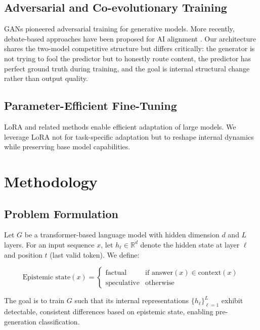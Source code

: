 \documentclass[11pt,a4paper]{article}
\begin{document}
\subsection{Adversarial and Co-evolutionary Training}

GANs \citep{goodfellow2014generative} pioneered adversarial training for generative models. More recently, debate-based approaches have been proposed for AI alignment \citep{irving2018ai}. Our architecture shares the two-model competitive structure but differs critically: the generator is not trying to fool the predictor but to honestly route content, the predictor has perfect ground truth during training, and the goal is internal structural change rather than output quality.

\subsection{Parameter-Efficient Fine-Tuning}

LoRA \citep{hu2021lora} and related methods \citep{lialin2023scaling} enable efficient adaptation of large models. We leverage LoRA not for task-specific adaptation but to reshape internal dynamics while preserving base model capabilities.

\section{Methodology}

\subsection{Problem Formulation}

Let $G$ be a transformer-based language model with hidden dimension $d$ and $L$ layers. For an input sequence $x$, let $h_\ell \in \mathbb{R}^d$ denote the hidden state at layer $\ell$ and position $t$ (last valid token). We define:

\begin{equation}
\text{Epistemic state}(x) = \begin{cases}
\text{factual} & \text{if } \text{answer}(x) \in \text{context}(x) \\
\text{speculative} & \text{otherwise}
\end{cases}
\end{equation}

The goal is to train $G$ such that its internal representations $\{h_\ell\}_{\ell=1}^L$ exhibit detectable, consistent differences based on epistemic state, enabling pre-generation classification.
\end{document}
